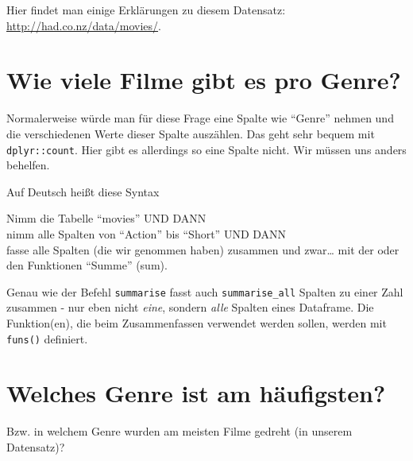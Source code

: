 \documentclass[12pt,ngerman,]{book}
\makeatletter
\newenvironment{Shaded}{\begin{snugshade}}{\end{snugshade}}
\newcommand{\KeywordTok}[1]{\textcolor[rgb]{0.13,0.29,0.53}{\textbf{{#1}}}}
\newcommand{\StringTok}[1]{\textcolor[rgb]{0.31,0.60,0.02}{{#1}}}
\newcommand{\CommentTok}[1]{\textcolor[rgb]{0.56,0.35,0.01}{\textit{{#1}}}}
\newcommand{\NormalTok}[1]{{#1}}
\newenvironment{kframe}{%
\medskip{}
\setlength{\fboxsep}{.8em}
 \def\at@end@of@kframe{}%
 \ifinner\ifhmode%
  \def\at@end@of@kframe{\end{minipage}}%
  \begin{minipage}{\columnwidth}%
 \fi\fi%
 \def\FrameCommand##1{\hskip\@totalleftmargin \hskip-\fboxsep
 \colorbox{shadecolor}{##1}\hskip-\fboxsep
     \hskip-\linewidth \hskip-\@totalleftmargin \hskip\columnwidth}%
 \MakeFramed {\advance\hsize-\width
   \@totalleftmargin\z@ \linewidth\hsize
   \@setminipage}}%
 {\par\unskip\endMakeFramed%
 \at@end@of@kframe}
\renewenvironment{Shaded}{\begin{kframe}}{\end{kframe}}
\theoremstyle{definition}
\theoremstyle{definition}
\theoremstyle{remark}
\let\BeginKnitrBlock\begin \let\EndKnitrBlock\end
\makeatother
\begin{document}
Hier findet man einige Erklärungen zu diesem Datensatz:
\url{http://had.co.nz/data/movies/}.

\section{Wie viele Filme gibt es pro
Genre?}\label{wie-viele-filme-gibt-es-pro-genre}

Normalerweise würde man für diese Frage eine Spalte wie ``Genre'' nehmen
und die verschiedenen Werte dieser Spalte auszählen. Das geht sehr
bequem mit \texttt{dplyr::count}. Hier gibt es allerdings so eine Spalte
nicht. Wir müssen uns anders behelfen.

\begin{Shaded}
\end{Shaded}

Auf Deutsch heißt diese Syntax

\BeginKnitrBlock{rmdpseudocode}
Nimm die Tabelle ``movies'' UND DANN\\
nimm alle Spalten von ``Action'' bis ``Short'' UND DANN\\
fasse alle Spalten (die wir genommen haben) zusammen und zwar\ldots{}
mit der oder den Funktionen ``Summe'' (sum).
\EndKnitrBlock{rmdpseudocode}

Genau wie der Befehl \texttt{summarise} fasst auch
\texttt{summarise\_all} Spalten zu einer Zahl zusammen - nur eben nicht
\emph{eine}, sondern \emph{alle} Spalten eines Dataframe. Die
Funktion(en), die beim Zusammenfassen verwendet werden sollen, werden
mit \texttt{funs()} definiert.

\section{Welches Genre ist am
häufigsten?}\label{welches-genre-ist-am-haufigsten}

Bzw. in welchem Genre wurden am meisten Filme gedreht (in unserem
Datensatz)?
\end{document}
